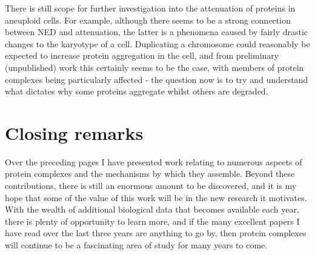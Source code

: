 \documentclass[a4paper,11pt,twoside,openright]{scrbook}
\begin{document}
There is still scope for further investigation into the attenuation of proteins in aneuploid cells. For example, although there seems to be a strong connection between NED and attenuation, the latter is a phenomena caused by fairly drastic changes to the karyotype of a cell. Duplicating a chromosome could reasonably be expected to increase protein aggregation in the cell, and from preliminary (unpublished) work this certainly seems to be the case, with members of protein complexes being particularly affected - the question now is to try and understand what dictates why some proteins aggregate whilst others are degraded.

\section{Closing remarks}
Over the preceding pages I have presented work relating to numerous aspects of protein complexes and the mechanisms by which they assemble. Beyond these contributions, there is still an enormous amount to be discovered, and it is my hope that some of the value of this work will be in the new research it motivates. With the wealth of additional biological data that becomes available each year, there is plenty of opportunity to learn more, and if the many excellent papers I have read over the last three years are anything to go by, then protein complexes will continue to be a fascinating area of study for many years to come.
\end{document}
